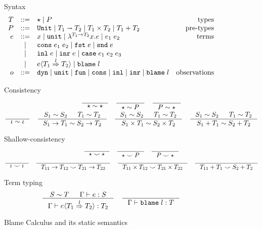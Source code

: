 \documentclass[acmsmall,review,anonymous]{acmart}\settopmatter{printfolios=true,printccs=false,printacmref=false}
\newcommand{\stxrule}[3]{#1 & ::= & #3 & \text{#2}\\}
\newcommand{\stxrulecont}[1]{& | & #1 & \\}
\newcommand{\plus}[0]{+}
\newcommand{\judgetype}[3]{#1 \vdash #2 : #3}
\newcommand{\POOunit}[0]{\mathtt{Unit}}
\newcommand{\POOfun}[2]{#1 \shortrightarrow #2}
\newcommand{\POOprod}[2]{#1 \times #2}
\newcommand{\POOsum}[2]{#1 \plus #2}
\newcommand{\eOOvar}[1]{#1}
\newcommand{\eOOsole}[0]{\mathtt{unit}}
\newcommand{\eOOlam}[4]{\lambda^{#1\rightarrow{}#2}#3.#4}
\newcommand{\eOOapp}[2]{#1 \; #2}
\newcommand{\eOOcons}[2]{\mathtt{cons} \; #1 \; #2}
\newcommand{\eOOcar}[1]{\mathtt{fst} \; #1}
\newcommand{\eOOcdr}[1]{\mathtt{snd} \; #1}
\newcommand{\eOOinl}[1]{\mathtt{inl} \; #1}
\newcommand{\eOOinr}[1]{\mathtt{inr} \; #1}
\newcommand{\eOOcase}[3]{\mathtt{case} \; #1 \; #2 \; #3}
\newcommand{\eOOcast}[4]{#1 \langle \cOOcast{#2}{#3}{#4} \rangle}
\newcommand{\eOOblame}[1]{\mathtt{blame} \; #1}
\newcommand{\oOOinj}{\mathtt{dyn}}
\newcommand{\oOOsole}{\mathtt{unit}}
\newcommand{\oOOfun}{\mathtt{fun}}
\newcommand{\oOOcons}{\mathtt{cons}}
\newcommand{\oOOinl}{\mathtt{inl}}
\newcommand{\oOOinr}{\mathtt{inr}}
\newcommand{\oOOblame}[1]{\mathtt{blame} \; #1}
\newcommand{\cOOcast}[3]{#1 \overset{#2}{\Rightarrow} #3}
\begin{document}
\begin{figure}
	Syntax
	\[
	\begin{array}{rclr}
	\stxrule{T}{types}{
		\star \mid{}
		P
	}
	\stxrule{P}{pre-types}{
		\POOunit \mid
		\POOfun{T_1}{T_2} \mid
		\POOprod{T_1}{T_2} \mid
		\POOsum{T_1}{T_2}
	}
	\stxrule{e}{terms}{
		\eOOvar{x} \mid{}
		\eOOsole{} \mid{}
		\eOOlam{T_1}{T_2}{x}{e} \mid
		\eOOapp{e_1}{e_2}
	}
	\stxrulecont{
		\eOOcons{e_1}{e_2} \mid
		\eOOcar{e} \mid
		\eOOcdr{e}
	}
	\stxrulecont{
		\eOOinl{e} \mid
		\eOOinr{e} \mid
		\eOOcase{e_1}{e_2}{e_3}
	}
	\stxrulecont{
		\eOOcast{e}{T_1}{l}{T_2} \mid
		\eOOblame{l}
	}
	\stxrule{o}{observations}{
		\oOOinj \mid
		\oOOsole \mid
		\oOOfun \mid
		\oOOcons \mid
		\oOOinl \mid
		\oOOinr \mid
		\oOOblame{l}
	}
	\end{array}
	\]
	
	Consistency
	\begin{gather*}
	\inference{}{
		\star \sim \star
	} \quad
	\inference{}{
		\star \sim P
	} \quad
	\inference{}{
		P \sim \star
	} \\
	\inference{}{
		\iota \sim \iota
	} \quad
	\inference{
		S_1 \sim S_2 &
		T_1 \sim T_2
	}{
		S_1 \rightarrow T_1 \sim S_2 \rightarrow T_2
	} \quad
	\inference{
		S_1 \sim S_2 &
		T_1 \sim T_2
	}{
		S_1 \times T_1 \sim S_2 \times T_2
	} \quad
	\inference{
		S_1 \sim S_2 &
		T_1 \sim T_2
	}{
		S_1 \plus T_1 \sim S_2 \plus T_2
	}
	\end{gather*}
	
	Shallow-consistency
	\begin{gather*}
	\inference{}{
		\star \smile \star
	} \quad
	\inference{}{
		\star \smile P
	} \quad
	\inference{}{
		P \smile \star
	} \\
	\inference{}{
		\iota \smile \iota
	} \quad
	\inference{}{
		T_{11} \rightarrow T_{12} \smile T_{21} \rightarrow T_{22}
	} \quad
	\inference{}{
		T_{11} \times T_{12} \smile T_{21} \times T_{22}
	} \quad
	\inference{}{
	T_{11} \plus T_1 \smile S_2 \plus T_2
	}
	\end{gather*}
	
	Term typing
	\fbox{$ \judgetype{\Gamma}{e}{T} $}
	\begin{gather*}
		\inference{
			S \sim T & \Gamma \vdash e : S 
		}{
			\judgetype{\Gamma}{\eOOcast{e}{T_1}{l}{T_2}}{T_2}
		} \quad
		\inference{
		}{
			\judgetype{\Gamma}{\eOOblame{l}}{T}
		}
	\end{gather*}
	
	\caption{Blame Calculus and its static semantics}
	\label{fig:blame-static}
\end{figure}
\end{document}
